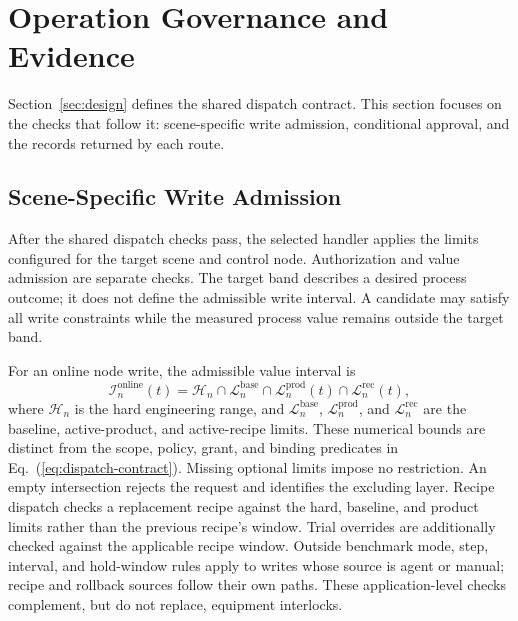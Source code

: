 \section{Operation Governance and Evidence}
\label{sec:modules}
Section~\ref{sec:design} defines the shared dispatch contract. This section
focuses on the checks that follow it: scene-specific write admission,
conditional approval, and the records returned by each route.

\subsection{Scene-Specific Write Admission}
\label{sec:governed}
After the shared dispatch checks pass, the selected handler applies the
limits configured for the target scene and control node. Authorization and value
admission are separate checks. The target band describes a desired process
outcome; it does not define the admissible write interval. A candidate may
satisfy all write constraints while the measured process value remains outside
the target band.

For an online node write, the admissible value interval is
\begin{equation}
\mathcal{I}^{\mathrm{online}}_n(t)=
\mathcal{H}_n\cap\mathcal{L}^{\mathrm{base}}_n\cap\mathcal{L}^{\mathrm{prod}}_n(t)\cap\mathcal{L}^{\mathrm{rec}}_n(t),
\label{eq:admission}
\end{equation}
where $\mathcal{H}_n$ is the hard engineering range, and
$\mathcal{L}^{\mathrm{base}}_n$, $\mathcal{L}^{\mathrm{prod}}_n$, and
$\mathcal{L}^{\mathrm{rec}}_n$ are the baseline, active-product, and
active-recipe limits. These numerical bounds are distinct from the scope,
policy, grant, and binding predicates in Eq.~(\ref{eq:dispatch-contract}).
Missing optional limits impose no restriction. An empty intersection rejects
the request and identifies the excluding layer. Recipe dispatch checks a
replacement recipe against the hard, baseline, and product limits rather than
the previous recipe's window. Trial overrides are additionally checked against
the applicable recipe window. Outside benchmark mode, step, interval, and
hold-window rules apply to writes whose source is agent or manual; recipe and
rollback sources follow their own paths. These application-level checks
complement, but do not replace, equipment interlocks.


